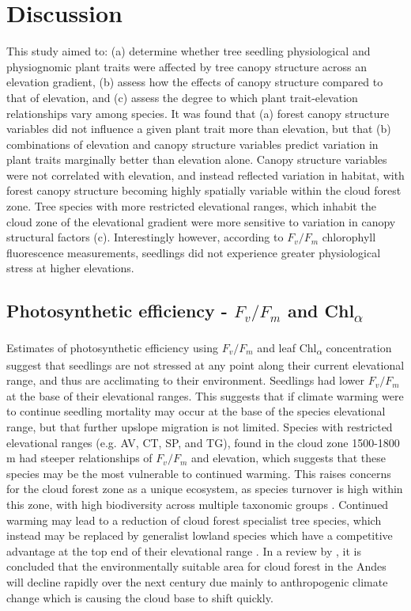 \documentclass[a4paper, 11pt]{article}
\newcommand{\textapprox}{\raisebox{0.5ex}{\texttildelow}}
\begin{document}


\section*{Discussion}

This study aimed to: (a) determine whether tree seedling physiological and physiognomic plant traits were affected by tree canopy structure across an elevation gradient, (b) assess how the effects of canopy structure compared to that of elevation, and (c) assess the degree to which plant trait-elevation relationships vary among species. It was found that (a) forest canopy structure variables did not influence a given plant trait more than elevation, but that (b) combinations of elevation and canopy structure variables predict variation in plant traits marginally better than elevation alone. Canopy structure variables were not correlated with elevation, and instead reflected variation in habitat, with forest canopy structure becoming highly spatially variable within the cloud forest zone. Tree species with more restricted elevational ranges, which inhabit the cloud zone of the elevational gradient were more sensitive to variation in canopy structural factors (c). Interestingly however, according to $F_v/F_m$ chlorophyll fluorescence measurements, seedlings did not experience greater physiological stress at higher elevations.

\subsection{Photosynthetic efficiency - $F_v/F_m$ and Chl\textsubscript{$\alpha$}}

Estimates of photosynthetic efficiency using $F_v/F_m$ and leaf Chl\textsubscript{$\alpha$} concentration suggest that seedlings are not stressed at any point along their current elevational range, and thus are acclimating to their environment. Seedlings had lower $F_v/F_m$ at the base of their elevational ranges. This suggests that if climate warming were to continue seedling mortality may occur at the base of the species elevational range, but that further upslope migration is not limited. Species with restricted elevational ranges (e.g. AV, CT, SP, and TG), found in the cloud zone \textapprox{}1500-1800 m had steeper relationships of $F_v/F_m$ and elevation, which suggests that these species may be the most vulnerable to continued warming. This raises concerns for the cloud forest zone as a unique ecosystem, as species turnover is high within this zone, with high biodiversity across multiple taxonomic groups \citep{Ledo2012}. Continued warming may lead to a reduction of cloud forest specialist tree species, which instead may be replaced by generalist lowland species which have a competitive advantage at the top end of their elevational range \citep{Valladares2008, Nicotra2010}. In a review by \citet{Herzog2011}, it is concluded that the environmentally suitable area for cloud forest in the Andes will decline rapidly over the next century due mainly to anthropogenic climate change which is causing the cloud base to shift quickly.
\end{document}

